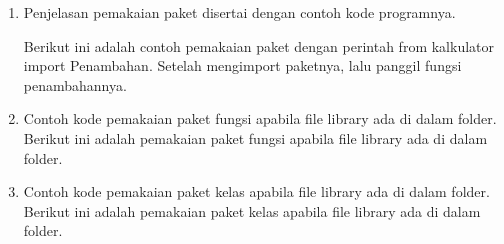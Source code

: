 \begin{enumerate}
	\item Penjelasan pemakaian paket disertai dengan contoh kode programnya.
	
	Berikut ini adalah contoh pemakaian paket dengan perintah from kalkulator import Penambahan. Setelah mengimport paketnya, lalu panggil fungsi penambahannya.
	
	
	\item Contoh kode pemakaian paket fungsi apabila file library ada di dalam folder. Berikut ini adalah pemakaian paket fungsi apabila file library ada di dalam folder.
	
	
	\item Contoh kode pemakaian paket kelas apabila file library ada di dalam folder. Berikut ini adalah pemakaian paket kelas apabila file library ada di dalam folder.
	
\end{enumerate}

